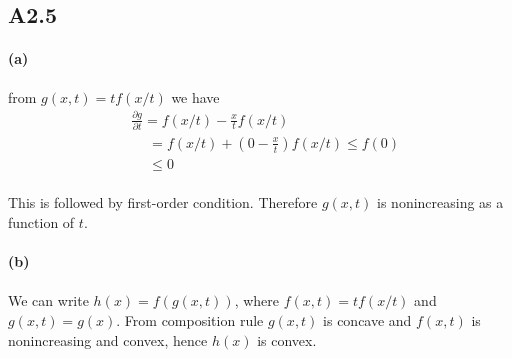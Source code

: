 \subsection*{A2.5}
\paragraph{(a)}
from $g(x,t) =tf(x/t)$ we have
\begin{align*}
	&\frac{\partial g }{\partial t} =f(x/t) -\frac{x}{t}f(x/t) \\
	&\quad \ = f(x/t) +(0-\frac{x}{t})f(x/t) \leq f(0) \\
	&\quad \ \leq 0
\end{align*}
\paragraph{}
This is followed by first-order condition. Therefore $g(x,t)$ is nonincreasing as a function of $t$.
\paragraph{(b)}
\paragraph{}
We can write $h(x) = f(g(x,t))$, where $f(x,t) = tf(x/t)$ and $g(x,t) =g(x)$. From composition rule $g(x,t)$ is concave and $f(x,t)$ is nonincreasing and convex, hence $h(x)$ is convex.